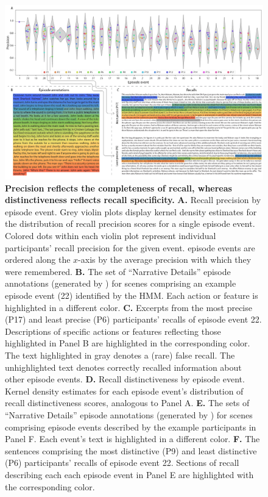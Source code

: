 \documentclass[10pt]{article}
\begin{document}
\begin{figure}[tp]
  \centering
  \includegraphics[width=1\textwidth]{figs/precision_detail}
  \caption{\small \textbf{Precision reflects the completeness of recall, whereas distinctiveness reflects recall specificity.} \textbf{A.} Recall precision by episode event.  Grey violin plots display kernel density estimates for the distribution of recall precision scores for a single episode event.  Colored dots within each violin plot represent individual participants' recall precision for the given event.  episode events are ordered along the $x$-axis by the average precision with which they were remembered.  \textbf{B.} The set of ``Narrative Details'' episode annotations (generated by \citealp{ChenEtal17}) for scenes comprising an example episode event (22) identified by the HMM.  Each action or feature is highlighted in a different color.  \textbf{C.} Excerpts from the most precise (P17) and least precise (P6) participants' recalls of episode event 22.  Descriptions of specific actions or features reflecting those highlighted in Panel B are highlighted in the corresponding color.  The text highlighted in gray denotes a (rare) false recall.  The unhighlighted text denotes correctly recalled information about other episode events.  \textbf{D.} Recall distinctiveness by episode event.  Kernel density estimates for each episode event's distribution of recall distinctiveness scores, analogous to Panel A.  \textbf{E.} The sets of ``Narrative Details'' episode annotations (generated by \citealp{ChenEtal17}) for scenes comprising episode events described by the example participants in Panel F.  Each event's text is highlighted in a different color.  \textbf{F.} The sentences comprising the most distinctive (P9) and least distinctive (P6) participants' recalls of episode event 22.  Sections of recall describing each each episode event in Panel E are highlighted with the corresponding color.}
  \label{fig:precision-detail}
\end{figure}
\end{document}
